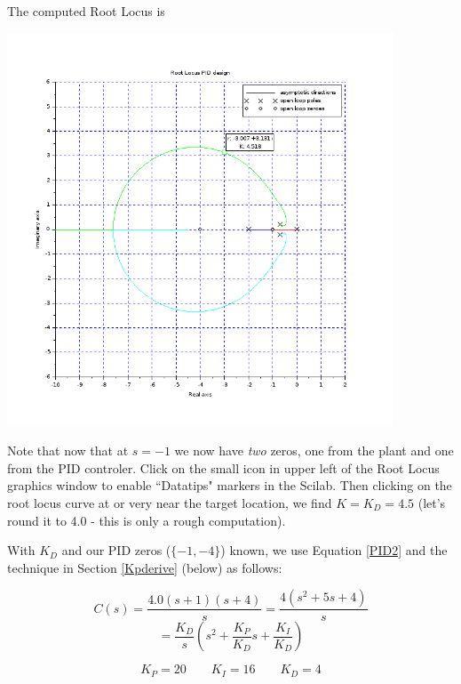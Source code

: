\begin{ExampleCont}
The computed Root Locus is

\begin{center}
\includegraphics[width=115mm]{figs09/ex912RL.png}
\end{center}

 Note that now that at $s=-1$ we now have {\it two} zeros, one from 
the plant and one from the PID controler. 
Click on the small icon in upper left of the Root Locus graphics
window to enable ``Datatips" markers in the Scilab.   Then clicking on the root locus curve at or 
very near the target location, we find $K = K_D = 4.5$ (let's round it to 4.0 - this is only a rough
computation).

With $K_D$ and our PID zeros ($\{-1, -4\}$) known, we use Equation \ref{PID2} 
and the technique in Section \ref{Kpderive} (below) as follows:

\[
C(s) = \frac{4.0(s+1)(s+4)}{s} = \frac {4(s^2+5s+4)} {s}
\]
\[
= \frac{K_D}{s} \left ( s^2+\frac{K_P}{K_D}s + \frac{K_I}{K_D} \right )
\]

\[
K_P = 20 \qquad K_I = 16 \qquad K_D = 4
\]

\end{ExampleCont}

